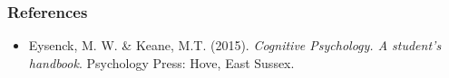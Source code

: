 \documentclass[]{beamer}
\begin{document}
\begin{frame}
 \frametitle{References}
\begin{small}
\begin{itemize}
 \item  Eysenck, M. W. \& Keane, M.T. (2015). \textit{Cognitive Psychology. A student's handbook}. Psychology Press: Hove, East Sussex. 
\end{itemize}
\end{small}
\end{frame}
\end{document}
